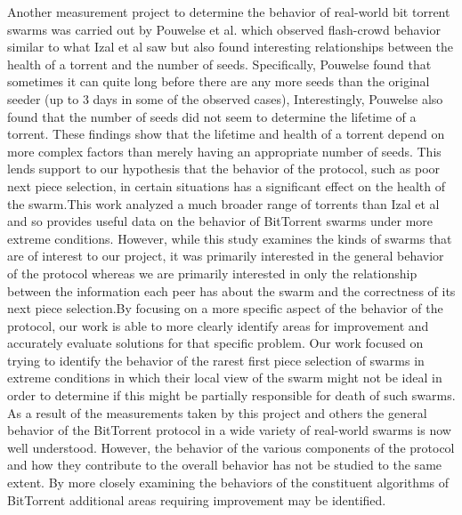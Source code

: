 Another measurement project \cite{pouwelse} to determine the behavior of real-world
bit torrent swarms was carried out by Pouwelse et al. which observed
flash-crowd behavior similar to what Izal et al saw but also found
interesting relationships between the health of a torrent and the number
of seeds. Specifically, Pouwelse found that sometimes it can quite long
before there are any more seeds than the original seeder (up to 3 days
in some of the observed cases), Interestingly, Pouwelse also found
that the number of seeds did not seem to determine the lifetime of a
torrent. These findings show that the lifetime and health of a torrent
depend on more complex factors than merely having an appropriate number
of seeds. This lends support to our hypothesis that the behavior of the
protocol, such as poor next piece selection, in certain situations has a
significant effect on the health of the swarm.This work analyzed a much
broader range of torrents than Izal et al and so provides useful data on
the behavior of BitTorrent swarms under more extreme conditions. However,
while this study examines the kinds of swarms that are of interest to
our project, it was primarily interested in the general behavior of the
protocol whereas we are primarily interested in only the relationship
between the information each peer has about the swarm and the correctness
of its next piece selection.By focusing on a more specific aspect of
the behavior of the protocol, our work is able to more clearly identify
areas for improvement and accurately evaluate solutions for that specific
problem. Our work focused on trying to identify the behavior of the
rarest first piece selection of swarms in extreme conditions in which
their local view of the swarm might not be ideal in order to determine
if this might be partially responsible for death of such swarms. As a
result of the measurements taken by this project and others the general
behavior of the BitTorrent protocol in a wide variety of real-world swarms
is now well understood. However, the behavior of the various components
of the protocol and how they contribute to the overall behavior has not
be studied to the same extent. By more closely examining the behaviors
of the constituent algorithms of BitTorrent additional areas requiring
improvement may be identified.

